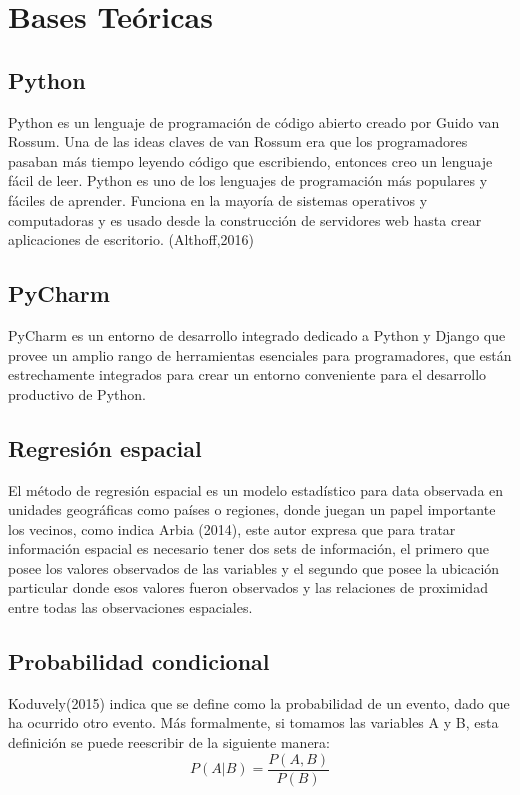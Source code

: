 \section{Bases Te\'oricas}

\subsection{Python}

Python es un lenguaje de programación de código abierto creado por Guido van Rossum. Una de las ideas claves de van Rossum era que los programadores pasaban más tiempo leyendo código que escribiendo, entonces creo un lenguaje fácil de leer. Python es uno de los lenguajes de programación más populares y fáciles de aprender. Funciona en la mayoría de sistemas operativos y computadoras y es usado desde la construcción de servidores web hasta crear aplicaciones de escritorio. (Althoff,2016)

\subsection{PyCharm}
PyCharm es un entorno de desarrollo integrado dedicado a Python y Django que provee un amplio rango de herramientas esenciales para programadores, que están estrechamente integrados para crear un entorno conveniente para el desarrollo productivo de Python.

\subsection{Regresión espacial}

El método de regresión espacial es un modelo estadístico para data observada en unidades geográficas como países o regiones, donde juegan un papel importante los vecinos, como indica Arbia (2014), este autor expresa que para tratar información espacial es necesario tener dos sets de información, el primero que posee los valores observados de las variables y el segundo que posee la ubicación particular donde esos valores fueron observados y las relaciones de proximidad entre todas las observaciones espaciales. 

\subsection{Probabilidad condicional}

Koduvely(2015) indica que se define como la probabilidad de un evento, dado que ha ocurrido otro evento. Más formalmente, si tomamos las variables A y B, esta definición se puede reescribir de la siguiente manera:
	\[P\left(A|B\right)=\frac{P\left(A,B\right)}{P\left(B\right)}
\]

